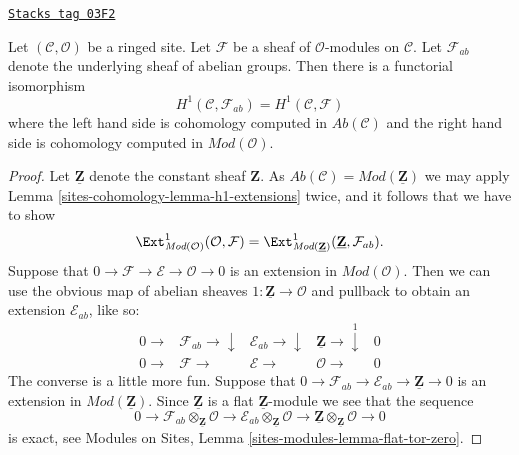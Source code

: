 \begin{lemma}
\label{sites-cohomology-lemma-h1-mod-ab-agree}
\href{https://stacks.math.columbia.edu/tag/03F2}{\texttt{Stacks tag 03F2}}

Let $(\mathcal{C}, \mathcal{O})$ be a ringed site.
Let $\mathcal{F}$ be a sheaf of $\mathcal{O}$-modules on $\mathcal{C}$.
Let $\mathcal{F}_{ab}$ denote the underlying sheaf of abelian
groups. Then there is a functorial isomorphism
$$
H^1(\mathcal{C}, \mathcal{F}_{ab})
=
H^1(\mathcal{C}, \mathcal{F})
$$
where the left hand side is cohomology computed in
$\textit{Ab}(\mathcal{C})$ and the right hand side
is cohomology computed in $\textit{Mod}(\mathcal{O})$.
\end{lemma}

\begin{proof}
Let $\underline{\mathbf{Z}}$ denote the constant sheaf
$\mathbf{Z}$. As
$\textit{Ab}(\mathcal{C}) = \textit{Mod}(\underline{\mathbf{Z}})$
we may apply
Lemma \ref{sites-cohomology-lemma-h1-extensions}
twice, and it follows that we have to show
$$
\Ext^1_{\textit{Mod}(\mathcal{O})}(\mathcal{O}, \mathcal{F})
=
\Ext^1_{\textit{Mod}(\underline{\mathbf{Z}})}(
\underline{\mathbf{Z}}, \mathcal{F}_{ab}).
$$
Suppose that $0 \to \mathcal{F} \to \mathcal{E} \to \mathcal{O} \to 0$
is an extension in $\textit{Mod}(\mathcal{O})$. Then we can use
the obvious map of abelian sheaves
$1 : \underline{\mathbf{Z}} \to \mathcal{O}$
and pullback to obtain an extension $\mathcal{E}_{ab}$, like so:
$$
\begin{array}{ccccc}0 \longrightarrow & \mathcal{F}_{ab} \longrightarrow\downarrow & \mathcal{E}_{ab} \longrightarrow\downarrow & \underline{\mathbf{Z}} \longrightarrow\overset{1}{\downarrow} & 0 \\ 0 \longrightarrow & \mathcal{F} \longrightarrow & \mathcal{E} \longrightarrow & \mathcal{O} \longrightarrow & 0\end{array}
$$
The converse is a little more fun. Suppose that
$0 \to \mathcal{F}_{ab} \to \mathcal{E}_{ab} \to \underline{\mathbf{Z}} \to 0$
is an extension in $\textit{Mod}(\underline{\mathbf{Z}})$.
Since $\underline{\mathbf{Z}}$ is a flat $\underline{\mathbf{Z}}$-module
we see that the sequence
$$
0 \to \mathcal{F}_{ab} \otimes_{\underline{\mathbf{Z}}} \mathcal{O}
\to \mathcal{E}_{ab} \otimes_{\underline{\mathbf{Z}}} \mathcal{O}
\to \underline{\mathbf{Z}} \otimes_{\underline{\mathbf{Z}}} \mathcal{O}
\to 0
$$
is exact, see
Modules on Sites, Lemma \ref{sites-modules-lemma-flat-tor-zero}.

\end{proof}
